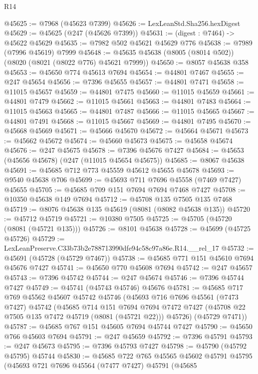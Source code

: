 \begin{lexlean}{R14}
\begin{coremodule}
@45625 := @7968 (@45623 @7399)
@45626 := LexLeanStd.Sha256.hexDigest
@45629 := @45625 (@247 (@45626 @7399))
@45631 := (digest : @7464) -> @45622 @45629
@45635 := @7982 @502 @45621 @45629 @776
@45638 := @7989 (@7996 @45619) @7999
@45648 := @45635 @45638 (@8005 (@8014 @502)) (@8020 (@8021 (@8022 @776) @45621 @7999))
@45650 := @8057 @45638 @358
@45653 := @45650 @774 @45613 @7694
@45654 := @44801 @7467
@45655 := @247 @45654
@45656 := @7396 @45655
@45657 := @44801 @7471
@45658 := @11015 @45657
@45659 := @44801 @7475
@45660 := @11015 @45659
@45661 := @44801 @7479
@45662 := @11015 @45661
@45663 := @44801 @7483
@45664 := @11015 @45663
@45665 := @44801 @7487
@45666 := @11015 @45665
@45667 := @44801 @7491
@45668 := @11015 @45667
@45669 := @44801 @7495
@45670 := @45668 @45669
@45671 := @45666 @45670
@45672 := @45664 @45671
@45673 := @45662 @45672
@45674 := @45660 @45673
@45675 := @45658 @45674
@45676 := @247 @45675
@45678 := @7396 @45676 @7427
@45684 := @45653 (@45656 @45678) (@247 (@11015 @45654 @45675))
@45685 := @8067 @45638
@45691 := @45685 @712 @773 @45559 @45612 @45655 @45678
@45693 := @9540 @45638 @706
@45699 := @45693 @711 @7696 @45558 (@7469 @7427) @45655
@45705 := @45685 @709 @151 @7694 @7694 @7468 @7427
@45708 := @10350 @45638 @149 @7694
@45712 := @45708 @135 @7505 @135 @7468
@45719 := @8076 @45638 @135 @45619 (@8081 (@8082 @45638 @135))
@45720 := @45712 @45719
@45721 := @10380 @7505
@45725 := @45705 (@45720 (@8081 (@45721 @135)))
@45726 := @8101 @45638
@45728 := @45699 (@45725 @45726)
@45729 := LexLeanPreserve.C33b73b2e788713990dfe94c58c97a86e.R14.__rel_17
@45732 := @45691 (@45728 (@45729 @7467))
@45738 := @45685 @771 @151 @45610 @7694 @45676 @7427
@45741 := @45650 @770 @45608 @7694
@45742 := @247 @45657
@45743 := @7396 @45742
@45744 := @247 @45674
@45746 := @7396 @45744 @7427
@45749 := @45741 (@45743 @45746) @45676
@45781 := @45685
    @717
    @769
    @45562
    @45607
    @45742
    @45746
    (@45693
      @716
      @7696
      @45561
      (@7473 @7427)
      @45742
      (@45685
        @714
        @151
        @7694
        @7694
        @7472
        @7427
        (@45708 @22 @7505 @135 @7472 @45719 (@8081 (@45721 @22)))
        @45726)
      (@45729 @7471))
@45787 := @45685 @767 @151 @45605 @7694 @45744 @7427
@45790 := @45650 @766 @45603 @7694
@45791 := @247 @45659
@45792 := @7396 @45791
@45793 := @247 @45673
@45795 := @7396 @45793 @7427
@45798 := @45790 (@45792 @45795) @45744
@45830 := @45685
    @722
    @765
    @45565
    @45602
    @45791
    @45795
    (@45693
      @721
      @7696
      @45564
      (@7477 @7427)
      @45791
      (@45685

\end{coremodule}
\end{lexlean}
